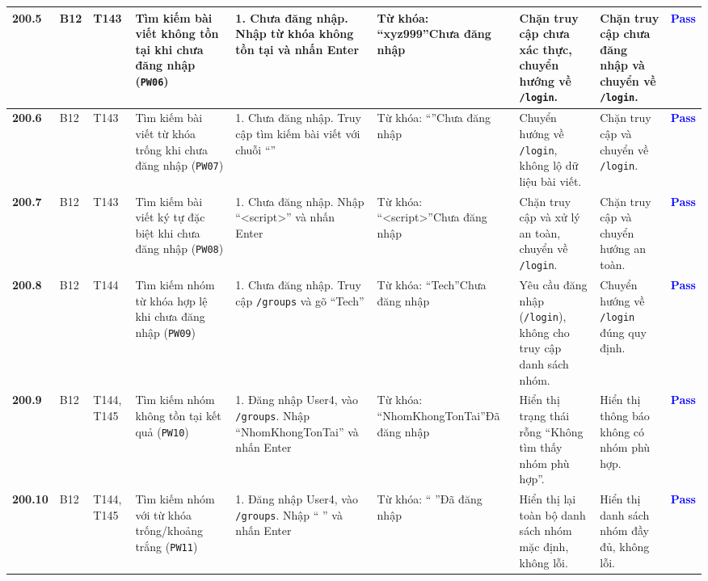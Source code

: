 \documentclass[11pt,a4paper]{article}
\begin{document}
\begin{longtable}{|C{0.9cm}|C{0.7cm}|C{0.9cm}|L{2.0cm}|L{3.0cm}|L{2.2cm}|L{2.6cm}|L{2.5cm}|C{0.85cm}|}
\textbf{200.5} & B12 & T143 & Tìm kiếm bài viết không tồn tại khi chưa đăng nhập (\texttt{PW06}) & 1. Chưa đăng nhập. Nhập từ khóa không tồn tại và nhấn Enter & Từ khóa: ``xyz999''\newline Chưa đăng nhập & Chặn truy cập chưa xác thực, chuyển hướng về \texttt{/login}. & Chặn truy cập chưa đăng nhập và chuyển về \texttt{/login}. & \textcolor{blue}{\textbf{Pass}} \\ \hline
\textbf{200.6} & B12 & T143 & Tìm kiếm bài viết từ khóa trống khi chưa đăng nhập (\texttt{PW07}) & 1. Chưa đăng nhập. Truy cập tìm kiếm bài viết với chuỗi ``'' & Từ khóa: ``''\newline Chưa đăng nhập & Chuyển hướng về \texttt{/login}, không lộ dữ liệu bài viết. & Chặn truy cập và chuyển về \texttt{/login}. & \textcolor{blue}{\textbf{Pass}} \\ \hline
\textbf{200.7} & B12 & T143 & Tìm kiếm bài viết ký tự đặc biệt khi chưa đăng nhập (\texttt{PW08}) & 1. Chưa đăng nhập. Nhập ``<script>'' và nhấn Enter & Từ khóa: ``<script>''\newline Chưa đăng nhập & Chặn truy cập và xử lý an toàn, chuyển về \texttt{/login}. & Chặn truy cập và chuyển hướng an toàn. & \textcolor{blue}{\textbf{Pass}} \\ \hline
\textbf{200.8} & B12 & T144 & Tìm kiếm nhóm từ khóa hợp lệ khi chưa đăng nhập (\texttt{PW09}) & 1. Chưa đăng nhập. Truy cập \texttt{/groups} và gõ ``Tech'' & Từ khóa: ``Tech''\newline Chưa đăng nhập & Yêu cầu đăng nhập (\texttt{/login}), không cho truy cập danh sách nhóm. & Chuyển hướng về \texttt{/login} đúng quy định. & \textcolor{blue}{\textbf{Pass}} \\ \hline
\textbf{200.9} & B12 & T144, T145 & Tìm kiếm nhóm không tồn tại kết quả (\texttt{PW10}) & 1. Đăng nhập User4, vào \texttt{/groups}. Nhập ``NhomKhongTonTai'' và nhấn Enter & Từ khóa: ``NhomKhongTonTai''\newline Đã đăng nhập & Hiển thị trạng thái rỗng ``Không tìm thấy nhóm phù hợp''. & Hiển thị thông báo không có nhóm phù hợp. & \textcolor{blue}{\textbf{Pass}} \\ \hline
\textbf{200.10} & B12 & T144, T145 & Tìm kiếm nhóm với từ khóa trống/khoảng trắng (\texttt{PW11}) & 1. Đăng nhập User4, vào \texttt{/groups}. Nhập ``   '' và nhấn Enter & Từ khóa: ``   ''\newline Đã đăng nhập & Hiển thị lại toàn bộ danh sách nhóm mặc định, không lỗi. & Hiển thị danh sách nhóm đầy đủ, không lỗi. & \textcolor{blue}{\textbf{Pass}} \\ \hline

\end{longtable}
\end{document}
